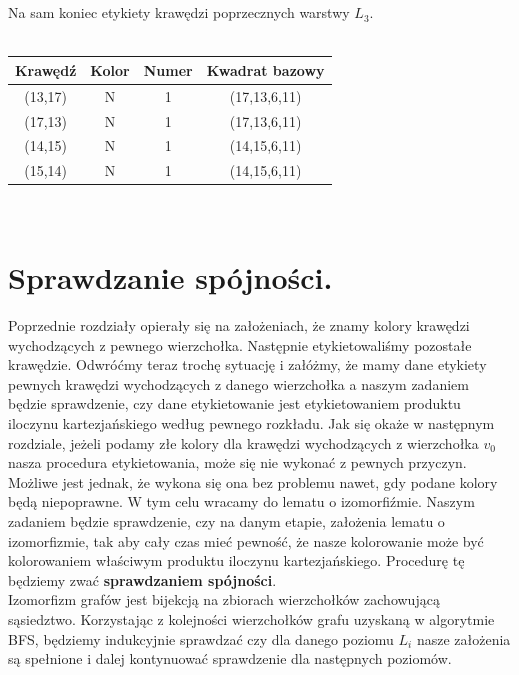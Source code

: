 \documentclass[12pt,a4paper,titlepage]{article}
\newcommand\tab[1][1cm]{\hspace*{#1}}
\begin{document}
\\
\\
Na sam koniec etykiety krawędzi poprzecznych warstwy $L_3$.\\
\\
\begin{tabular}{|c|c|c|c|}\hline
Krawędź & Kolor & Numer & Kwadrat bazowy \\ \hline
(13,17) & N & 1 & (17,13,6,11)\\ \hline
(17,13) & N & 1 & (17,13,6,11)\\ \hline
(14,15) & N & 1 & (14,15,6,11)\\ \hline
(15,14) & N & 1 & (14,15,6,11)\\ \hline
\end{tabular}
\\
\newpage
\section{Sprawdzanie spójności.}
Poprzednie rozdziały opierały się na założeniach, że znamy kolory krawędzi wychodzących z pewnego wierzchołka. Następnie etykietowaliśmy pozostałe krawędzie. Odwróćmy teraz trochę sytuację i załóżmy, że mamy dane etykiety pewnych krawędzi wychodzących z danego wierzchołka a naszym zadaniem będzie sprawdzenie, czy dane etykietowanie jest etykietowaniem produktu iloczynu kartezjańskiego według pewnego rozkładu. Jak się okaże w następnym rozdziale, jeżeli podamy złe kolory dla krawędzi wychodzących z wierzchołka $v_0$ nasza procedura etykietowania, może się nie wykonać z pewnych przyczyn. Możliwe jest jednak, że wykona się ona bez problemu nawet, gdy podane kolory będą niepoprawne. W tym celu wracamy do lematu o izomorfiźmie. Naszym zadaniem będzie sprawdzenie, czy na danym etapie, założenia lematu o izomorfizmie, tak aby cały czas mieć pewność, że nasze kolorowanie może być kolorowaniem właściwym produktu iloczynu kartezjańskiego. Procedurę tę będziemy zwać \textbf{sprawdzaniem spójności}.\\
\tab[0.6cm]Izomorfizm grafów jest bijekcją na zbiorach wierzchołków zachowującą sąsiedztwo. Korzystając z kolejności wierzchołków grafu uzyskaną w algorytmie BFS, będziemy indukcyjnie sprawdzać czy dla danego poziomu $L_i$ nasze założenia są spełnione i dalej kontynuować sprawdzenie dla następnych poziomów. \\
\end{document}
